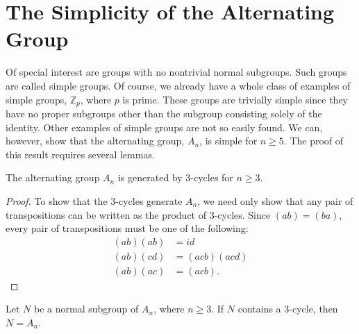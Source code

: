 
\section{The Simplicity of the Alternating Group}\label{normal:section:simplealternating}
 
 
 
 
Of special interest are groups with no nontrivial normal subgroups.
Such groups are called {\bfi simple
groups}.  Of course, we
already have a whole class of examples of simple groups, ${\mathbb Z}_p$,
where $p$ is prime.  These groups are trivially simple since they have
no proper subgroups other than the subgroup consisting solely of the
identity. Other examples of simple groups are not so easily found.
We can, however, show that the alternating group, $A_n$, is simple for
$n \geq 5$. The proof of this result requires several lemmas. 
 
 
\begin{lemma}\label{normal:3cycle_lemma1}
The alternating group $A_n$ is generated by $3$-cycles for $n \geq 3$.
\end{lemma}
 
\begin{proof}
To show that the 3-cycles generate $A_n$, we need only show that any
pair of transpositions can be written as the product of 3-cycles.
Since $(a b) = (b a)$, every pair of transpositions must be one of the
following: 
\begin{align*}
(ab)(ab) & = id \\
(ab)(cd) & = (acb)(acd) \\
(ab)(ac) & = (acb).
\end{align*}
\end{proof}
 
 
\begin{lemma}\label{normal:3cycle_lemma2}
Let $N$ be a  normal subgroup of $A_n$, where $n \geq 3$. If $N$ 
contains a $3$-cycle, then $N = A_n$. 
\end{lemma}
 
